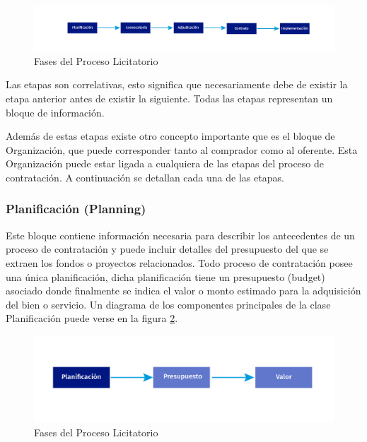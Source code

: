 \begin{figure}[h!]
    \centering
    \includegraphics[width=150mm]{figuras/Diagramas_ProcesoLicitatorio.png}
    \caption{Fases del Proceso Licitatorio}
    \label{img:fases del proceso licitatorio }
\end{figure}

Las etapas son correlativas, esto significa que necesariamente debe de existir la etapa anterior antes de existir la siguiente. Todas las etapas representan un bloque de información.

Además de estas etapas existe otro concepto importante que es el bloque de Organización, que puede corresponder tanto al comprador como al oferente. Esta Organización puede estar ligada a cualquiera de las etapas del proceso de contratación. A continuación se detallan cada una de las etapas.
\subsubsection{Planificación (Planning)}

Este bloque contiene información necesaria para describir los antecedentes de un proceso de contratación y puede incluir detalles del presupuesto del que se extraen los fondos o proyectos relacionados. Todo proceso de contratación posee una única planificación, dicha planificación tiene un presupuesto (budget) asociado donde finalmente se indica el valor o monto estimado para la adquisición del bien o servicio. Un diagrama de los componentes principales de la clase Planificación puede verse en la figura \ref{img:Fase de Planificacion}.

\begin{figure}[h!]
    \centering
    \includegraphics[width=150mm]{figuras/Diagramas_Planificacion.png}
    \caption{Fases del Proceso Licitatorio}
    \label{img:Fase de Planificacion}
\end{figure}

